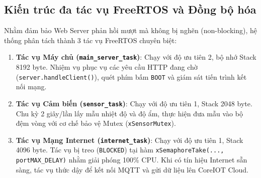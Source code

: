 \subsection{Kiến trúc đa tác vụ FreeRTOS và Đồng bộ hóa}
Nhằm đảm bảo Web Server phản hồi mượt mà không bị nghẽn (non-blocking), hệ thống phân tách thành 3 tác vụ FreeRTOS chuyên biệt:
\begin{enumerate}
    \item \textbf{Tác vụ Máy chủ (\texttt{main\_server\_task})}: Chạy với độ ưu tiên 2, bộ nhớ Stack 8192 byte. Nhiệm vụ phục vụ các yêu cầu HTTP đang chờ (\texttt{server.handleClient()}), quét phím bấm \texttt{BOOT} và giám sát tiến trình kết nối mạng.
    \item \textbf{Tác vụ Cảm biến (\texttt{sensor\_task})}: Chạy với độ ưu tiên 1, Stack 2048 byte. Chu kỳ 2 giây/lần lấy mẫu nhiệt độ và độ ẩm, thực hiện đưa mẫu vào bộ đệm vòng với cơ chế bảo vệ Mutex (\texttt{xSensorMutex}).
    \item \textbf{Tác vụ Mạng Internet (\texttt{internet\_task})}: Chạy với độ ưu tiên 1, Stack 4096 byte. Tác vụ bị treo (\texttt{BLOCKED}) tại hàm \texttt{xSemaphoreTake(..., portMAX\_DELAY)} nhằm giải phóng 100\% CPU. Khi có tín hiệu Internet sẵn sàng, tác vụ thức dậy để kết nối MQTT và gửi dữ liệu lên CoreIOT Cloud.
\end{enumerate}

